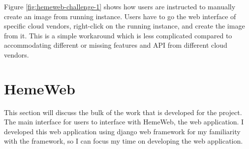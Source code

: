 \noindent%
\begin{minipage}{\linewidth}%
\label{fig:hemeweb-challenge-1}%
\end{minipage}

\vspace{1cm}

Figure \ref{fig:hemeweb-challenge-1} shows how users are instructed to manually create an image from running instance. Users have to go the web interface of specific cloud vendors, right-click on the running instance, and create the image from it. This is a simple workaround which is less complicated compared to accommodating different or missing features and API from different cloud vendors.



\section{HemeWeb}

This section will discuss the bulk of the work that is developed for the project. The main interface for users to interface with HemeWeb, the web application.  I developed this web application using django web framework for my familiarity with the framework, so I can focus my time on developing the web application.



